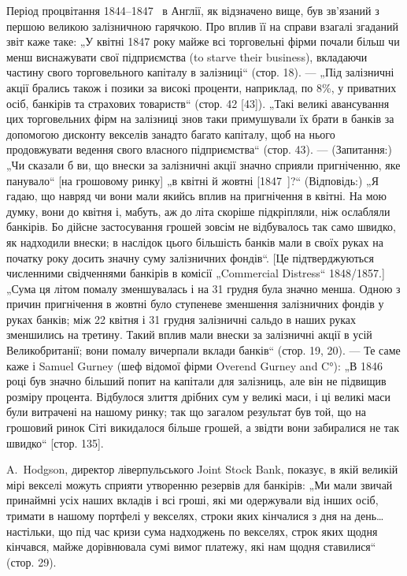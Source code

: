 Період процвітання 1844--1847~ в Англії, як відзначено вище, був зв’язаний
з першою великою залізничною гарячкою. Про вплив її на справи взагалі згаданий звіт каже таке: „У
квітні 1847 року майже всі торговельні фірми почали
більш чи менш виснажувати свої підприємства (to starve their business), вкладаючи частину свого
торговельного капіталу в залізниці“ (стор. 18). — „Під залізничні акції брались також і позики за
високі проценти, наприклад, по 8\%,
у приватних осіб, банкірів та страхових товариств“ (стор. 42 [43]). „Такі великі
авансування цих торговельних фірм на залізниці знов таки примушували їх брати
в банків за допомогою дисконту векселів занадто багато капіталу, щоб на нього
продовжувати ведення свого власного підприємства“ (стор. 43). — (Запитання:) „Чи
сказали б ви, що внески за залізничні акції значно сприяли пригніченню, яке
панувало“ [на грошовому ринку] „в квітні й жовтні [1847~]?“ (Відповідь:) „Я гадаю, що навряд чи
вони мали якийсь вплив на пригнічення в квітні. На мою думку,
вони до квітня і, мабуть, аж до літа скоріше підкріпляли, ніж ослабляли банкірів.
Бо дійсне застосування грошей зовсім не відбувалось так само швидко, як надходили внески; в наслідок
цього більшість банків мали в своїх руках на початку
року досить значну суму залізничних фондів“. [Це підтверджуються численними
свідченнями банкірів в комісії „Commercial Distress“ 1848/1857.] „Сума ця літом
помалу зменшувалась і на 31 грудня була значно менша. Одною з причин
пригнічення в жовтні було ступеневе зменшення залізничних фондів у руках
банків; між 22 квітня і 31 грудня залізничні сальдо в наших руках зменшились
на третину. Такий вплив мали внески за залізничні акції в усій Великобританії;
вони помалу вичерпали вклади банків“ (стор. 19, 20). — Те саме каже і Samuel
Gurney (шеф відомої фірми Overend Gurney and C°): „В 1846 році був значно
більший попит на капітали для залізниць, але він не підвищив розміру процента. Відбулося злиття
дрібних сум у великі маси, і ці великі маси були витрачені на нашому ринку; так що загалом результат
був той, що на грошовий
ринок Сіті викидалося більше грошей, а звідти вони забиралися не так
швидко“ [стор. 135].

A.~Hodgson, директор ліверпульського Joint Stock Bank, показує, в якій великій мірі векселі можуть
сприяти утворенню резервів для банкірів: „Ми мали
звичай принаймні  усіх наших вкладів і всі гроші, які ми одержували від
інших осіб, тримати в нашому портфелі у векселях, строки яких кінчалися
з дня на день\dots{} настільки, що під час кризи сума надходжень по векселях,
строк яких щодня кінчався, майже дорівнювала сумі вимог платежу, які нам
щодня ставилися“ (стор. 29).

